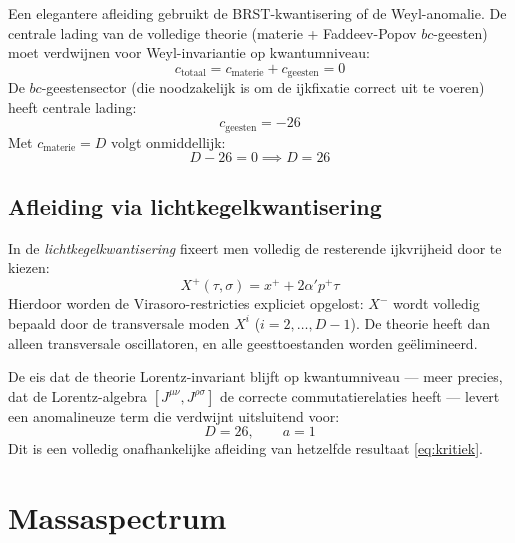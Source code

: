 \documentclass[12pt,a4paper]{article}
\begin{document}
            Een elegantere afleiding gebruikt de BRST-kwantisering of de Weyl-anomalie. De centrale lading van de volledige theorie (materie + Faddeev-Popov $bc$-geesten) moet verdwijnen voor Weyl-invariantie op kwantumniveau:
            \begin{equation}
                c_{\mathrm{totaal}} = c_{\mathrm{materie}} + c_{\mathrm{geesten}} = 0
            \end{equation}
            De $bc$-geestensector (die noodzakelijk is om de ijkfixatie correct uit te voeren) heeft centrale lading:
            \begin{equation}
                c_{\mathrm{geesten}} = -26
            \end{equation}
            Met $c_{\mathrm{materie}} = D$ volgt onmiddellijk:
            \begin{equation}
                D - 26 = 0 \implies \boxed{D = 26}
            \end{equation}

        \subsection{Afleiding via lichtkegelkwantisering}

            In de \emph{lichtkegelkwantisering} fixeert men volledig de resterende ijkvrijheid door te kiezen:
            \begin{equation}
                X^+(\tau,\sigma) = x^+ + 2\alpha' p^+\tau
            \end{equation}
            Hierdoor worden de Virasoro-restricties expliciet opgelost: $X^-$ wordt volledig bepaald door de transversale moden $X^i$ ($i = 2,\dots,D-1$). De theorie heeft dan alleen transversale oscillatoren, en alle geesttoestanden worden ge\"elimineerd.

            De eis dat de theorie Lorentz-invariant blijft op kwantumniveau --- meer precies, dat de Lorentz-algebra $[J^{\mu\nu},J^{\rho\sigma}]$ de correcte commutatierelaties heeft --- levert een anomalineuze term die verdwijnt uitsluitend voor:
            \begin{equation}
                D = 26, \qquad a = 1
            \end{equation}
            Dit is een volledig onafhankelijke afleiding van hetzelfde resultaat \eqref{eq:kritiek}.

    \section{Massaspectrum}
\end{document}
